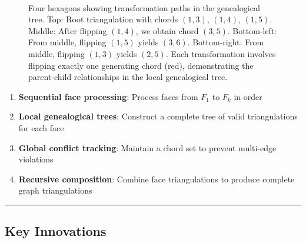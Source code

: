 ﻿﻿\documentclass[12pt,a4paper]{article}
\theoremstyle{definition}
\theoremstyle{remark}
\begin{document}
\begin{figure}[h]
	\caption{Four hexagons showing transformation paths in the genealogical tree. Top: Root triangulation with chords $(1,3)$, $(1,4)$, $(1,5)$. Middle: After flipping $(1,4)$, we obtain chord $(3,5)$. Bottom-left: From middle, flipping $(1,5)$ yields $(3,6)$. Bottom-right: From middle, flipping $(1,3)$ yields $(2,5)$. Each transformation involves flipping exactly one generating chord (red), demonstrating the parent-child relationships in the local genealogical tree.}
	\label{fig:four_hexagons_arrows}
\end{figure}

\begin{enumerate}
	\item \textbf{Sequential face processing}: Process faces from $F_1$ to $F_k$ in order
	\item \textbf{Local genealogical trees}: Construct a complete tree of valid triangulations for each face
	\item \textbf{Global conflict tracking}: Maintain a chord set to prevent multi-edge violations
	\item \textbf{Recursive composition}: Combine face triangulations to produce complete graph triangulations
\end{enumerate}

\noindent\rule{\textwidth}{0.4pt}



\subsection{Key Innovations}
\end{document}
